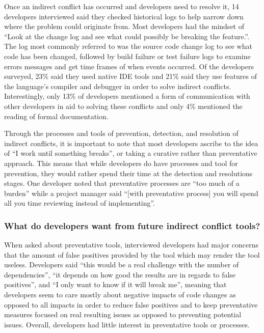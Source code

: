 Once an indirect conflict has occurred and developers need to resolve it, 14 developers interviewed said
they checked historical logs to help narrow down where the problem could originate from. Most developers had the mindset of
``Look at the change log and see what could possibly be breaking the feature.''. The log most commonly referred to was the source
code change log to see what code has been changed, followed by build failure or test failure logs to examine errors messages and get time 
frames of when events occurred. Of the developers surveyed, 23\% said they used native IDE tools and 21\% said they use 
features of the language's compiler and debugger in order to solve indirect conflicts. Interestingly, only 13\% of developers 
mentioned a form of communication with other developers in aid to solving these conflicts and only 4\% mentioned the reading 
of formal documentation.

Through the processes and tools of prevention, detection, and resolution of indirect conflicts, it is important to note that
most developers ascribe to the idea of ``I work until something breaks'', or taking a curative rather than preventative
approach. This means that while developers do have processes and tool for prevention, they would rather spend their time
at the detection and resolutions stages. One developer noted that preventative processes are ``too much of a burden''
while a project manager said ``[with preventative process] you will spend all you time reviewing instead of implementing''. 

\subsubsection{What do developers want from future indirect conflict tools?}

When asked about preventative tools, interviewed developers had major concerns that the amount of false positives
provided by the tool which may render the tool useless. Developers said ``this would
be a real challenge with the number of dependencies'', ``it depends on how
good the results are in regards to false positives'', and ``I only want to know if it will break me'', meaning that
developers seem to care mostly about negative impacts of code changes as opposed to all impacts in order to reduce 
false positives and to keep preventative measures focused on real resulting issues as opposed to preventing potential
issues. Overall, developers had little interest in preventative tools or processes.

